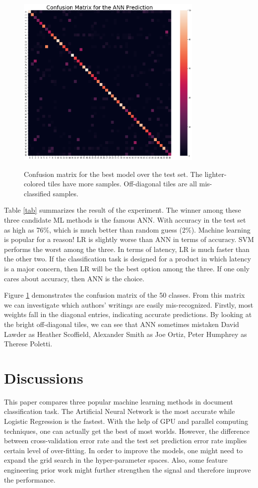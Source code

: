 \documentclass{article}
\begin{document}
\begin{figure}[htbp]
\centering
  {\includegraphics[width=0.8\textwidth]{confusion.png}}
    {\caption{Confusion matrix for the best model over the test set. The lighter-colored tiles have more samples. Off-diagonal tiles are all mis-classified samples.} \label{fig:cf}}
\end{figure}

Table \ref{tab} summarizes the result of the experiment. The winner among these three candidate ML methods is the famous ANN. With accuracy in the test set as high as 76\%, which is much better than random guess (2\%). Machine learning is popular for a reason! LR is slightly worse than ANN in terms of accuracy. SVM performs the worst among the three. In terms of latency, LR is much faster than the other two. If the classification task is designed for a product in which latency is a major concern, then LR will be the best option among the three. If one only cares about accuracy, then ANN is the choice. 

Figure \ref{fig:cf} demonstrates the confusion matrix of the 50 classes. From this matrix we can investigate which authors' writings are easily mis-recognized. Firstly, most weights fall in the diagonal entries, indicating accurate predictions. By looking at the bright off-diagonal tiles, we can see that ANN sometimes mistaken David Lawder as Heather Scoffield, Alexander Smith as Joe Ortiz, Peter Humphrey as Therese Poletti. 

\section{Discussions}
This paper compares three popular machine learning methods in document classification task. The Artificial Neural Network is the most accurate while Logistic Regression is the fastest. With the help of GPU and parallel computing techniques, one can actually get the best of most worlds. However, the difference between cross-validation error rate and the test set prediction error rate implies certain level of over-fitting. In order to improve the models, one might need to expand the grid search in the hyper-parameter spaces. Also, some feature engineering prior work might further strengthen the signal and therefore improve the performance. 
\end{document}
